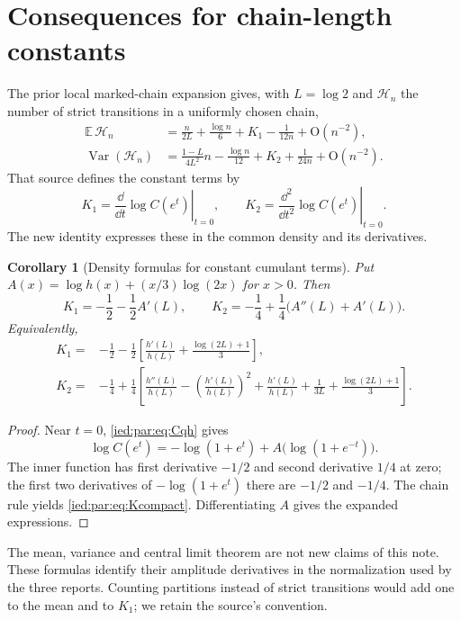 \documentclass[11pt,letterpaper]{article}
\newtheorem{corollary}[theorem]{Corollary}
\theoremstyle{remark}\newtheorem{remark}[theorem]{Remark}
\newcommand{\Oh}{\mathrm O}\newcommand{\supp}{\operatorname{supp}}
\begin{document}
\section{Consequences for chain-length constants}\label{ied:par:sec:constants}

The prior local marked-chain expansion \cite{Chains} gives, with
$L=\log2$ and $\mathcal H_n$ the number of strict transitions in a
uniformly chosen chain,
\begin{align}
 \mathbb E\,\mathcal H_n
 &=\frac n{2L}+\frac{\log n}{6}+K_1-\frac1{12n}
 +\Oh(n^{-2}),\label{ied:par:eq:mean}\\
 \operatorname{Var}(\mathcal H_n)
 &=\frac{1-L}{4L^2}n-\frac{\log n}{12}+K_2+\frac1{24n}
 +\Oh(n^{-2}).\label{ied:par:eq:variance}
\end{align}
That source defines the constant terms by
\[
 K_1=\left.\frac{\dd}{\dd t}\log C(e^t)\right|_{t=0},
 \qquad
 K_2=\left.\frac{\dd^2}{\dd t^2}\log C(e^t)\right|_{t=0}.
\]
The new identity expresses these in the common density and its
derivatives.

\begin{corollary}[Density formulas for constant cumulant terms]
\label{ied:par:cor:K}
Put $A(x)=\log h(x)+(x/3)\log(2x)$ for $x>0$. Then
\begin{equation}\label{ied:par:eq:Kcompact}
 K_1=-\frac12-\frac12A'(L),\qquad
 K_2=-\frac14+\frac14\bigl(A''(L)+A'(L)\bigr).
\end{equation}
Equivalently,
\begin{align}
 K_1={}&-\frac12-\frac12\left[
 \frac{h'(L)}{h(L)}+\frac{\log(2L)+1}{3}\right],
 \label{ied:par:eq:K1}\\
 K_2={}&-\frac14+\frac14\left[
 \frac{h''(L)}{h(L)}-\left(\frac{h'(L)}{h(L)}\right)^2
 +\frac{h'(L)}{h(L)}
 +\frac1{3L}+\frac{\log(2L)+1}{3}\right].
 \label{ied:par:eq:K2}
\end{align}
\end{corollary}
\begin{proof}
Near $t=0$, \eqref{ied:par:eq:Cqh} gives
\[
 \log C(e^t)=-\log(1+e^t)+
 A\bigl(\log(1+e^{-t})\bigr).
\]
The inner function has first derivative $-1/2$ and second derivative
$1/4$ at zero; the first two derivatives of $-\log(1+e^t)$ there are
$-1/2$ and $-1/4$. The chain rule yields \eqref{ied:par:eq:Kcompact}.
Differentiating $A$ gives the expanded expressions.
\end{proof}

The mean, variance and central limit theorem are not new claims of
this note. These formulas identify their amplitude derivatives in the
normalization used by the three reports.
Counting partitions instead of strict transitions would add one to
the mean and to $K_1$; we retain the source's convention.
\end{document}
